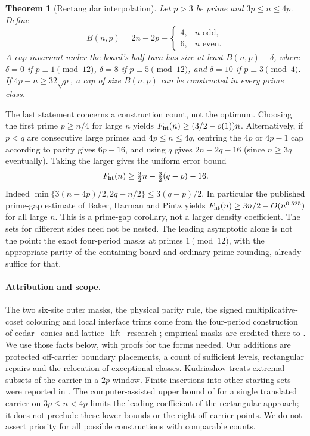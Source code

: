 \documentclass[11pt]{article}
\newtheorem{theorem}{Theorem}[section]\newtheorem{lemma}[theorem]{Lemma}\newtheorem{proposition}[theorem]{Proposition}\newtheorem{corollary}[theorem]{Corollary}
\begin{document}
\begin{theorem}[Rectangular interpolation]\label{thm:rect}
Let $p>3$ be prime and $3p\le n\le4p$. Define
\[
 B(n,p)=2n-2p-\begin{cases}4,&n\text{ odd},\\6,&n\text{ even}.\end{cases}
\]
A cap invariant under the board's half-turn has size at least $B(n,p)-\delta$, where $\delta=0$ if $p\equiv1\pmod{12}$, $\delta=8$ if $p\equiv5\pmod{12}$, and $\delta=10$ if $p\equiv3\pmod4$. If $4p-n\ge32\sqrt p$, a cap of size $B(n,p)$ can be constructed in every prime class.
\end{theorem}
The last statement concerns a construction count, not the optimum. Choosing the first prime $p\ge n/4$ for large $n$ yields $F_{\rm ht}(n)\ge(3/2-o(1))n$. Alternatively, if $p<q$ are consecutive large primes and $4p\le n\le4q$, centring the $4p$ or $4p-1$ cap according to parity gives $6p-16$, and using $q$ gives $2n-2q-16$ (since $n\ge3q$ eventually). Taking the larger gives the uniform error bound
\[
 F_{\rm ht}(n)\ge\tfrac32n-\tfrac32(q-p)-16.
\]
Indeed $\min\{3(n-4p)/2,2q-n/2\}\le3(q-p)/2$. In particular the published prime-gap estimate of Baker, Harman and Pintz \cite{bhp} yields $F_{\rm ht}(n)\ge3n/2-O(n^{0.525})$ for all large $n$. This is a prime-gap corollary, not a larger density coefficient. The sets for different sides need not be nested. The leading asymptotic alone is not the point: the exact four-period masks at primes $1\pmod{12}$, with the appropriate parity of the containing board and ordinary prime rounding, already suffice for that.

\paragraph{Attribution and scope.} The two six-site outer masks, the physical parity rule, the signed multiplicative-coset colouring and local interface trims come from the four-period construction of cedar\_conics and lattice\_lift\_research \cite{ring}; empirical masks are credited there to \cite{map}. We use those facts below, with proofs for the forms needed. Our additions are protected off-carrier boundary placements, a count of sufficient levels, rectangular repairs and the relocation of exceptional classes. Kudriashov \cite{window} treats extremal subsets of the carrier in a $2p$ window. Finite insertions into other starting sets were reported in \cite{insertions}. The computer-assisted upper bound of \cite{ladder} for a single translated carrier on $3p\le n<4p$ limits the leading coefficient of the rectangular approach; it does not preclude these lower bounds or the eight off-carrier points. We do not assert priority for all possible constructions with comparable counts.
\end{document}
